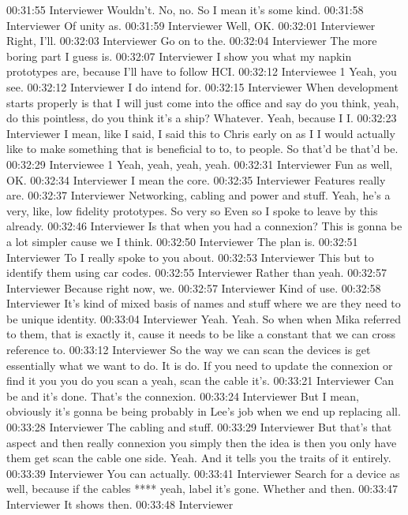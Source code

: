 00:31:55 Interviewer
Wouldn't. No, no. So I mean it's some kind.
00:31:58 Interviewer
Of unity as.
00:31:59 Interviewer
Well, OK.
00:32:01 Interviewer
Right, I'll.
00:32:03 Interviewer
Go on to the.
00:32:04 Interviewer
The more boring part I guess is.
00:32:07 Interviewer
I show you what my napkin prototypes are, because I'll have to follow HCI.
00:32:12 Interviewee 1
Yeah, you see.
00:32:12 Interviewer
I do intend for.
00:32:15 Interviewer
When development starts properly is that I will just come into the office and say do you think, yeah, do this pointless, do you think it's a ship? Whatever. Yeah, because I I.
00:32:23 Interviewer
I mean, like I said, I said this to Chris early on as I I would actually like to make something that is beneficial to to, to people. So that'd be that'd be.
00:32:29 Interviewee 1
Yeah, yeah, yeah, yeah.
00:32:31 Interviewer
Fun as well, OK.
00:32:34 Interviewer
I mean the core.
00:32:35 Interviewer
Features really are.
00:32:37 Interviewer
Networking, cabling and power and stuff. Yeah, he's a very, like, low fidelity prototypes. So very so Even so I spoke to leave by this already.
00:32:46 Interviewer
Is that when you had a connexion? This is gonna be a lot simpler cause we I think.
00:32:50 Interviewer
The plan is.
00:32:51 Interviewer
To I really spoke to you about.
00:32:53 Interviewer
This but to identify them using car codes.
00:32:55 Interviewer
Rather than yeah.
00:32:57 Interviewer
Because right now, we.
00:32:57 Interviewer
Kind of use.
00:32:58 Interviewer
It's kind of mixed basis of names and stuff where we are they need to be unique identity.
00:33:04 Interviewer
Yeah. Yeah. So when when Mika referred to them, that is exactly it, cause it needs to be like a constant that we can cross reference to.
00:33:12 Interviewer
So the way we can scan the devices is get essentially what we want to do. It is do. If you need to update the connexion or find it you you do you scan a yeah, scan the cable it's.
00:33:21 Interviewer
Can be and it's done. That's the connexion.
00:33:24 Interviewer
But I mean, obviously it's gonna be being probably in Lee's job when we end up replacing all.
00:33:28 Interviewer
The cabling and stuff.
00:33:29 Interviewer
But that's that aspect and then really connexion you simply then the idea is then you only have them get scan the cable one side. Yeah. And it tells you the traits of it entirely.
00:33:39 Interviewer
You can actually.
00:33:41 Interviewer
Search for a device as well, because if the cables **** yeah, label it's gone. Whether and then.
00:33:47 Interviewer
It shows then.
00:33:48 Interviewer
